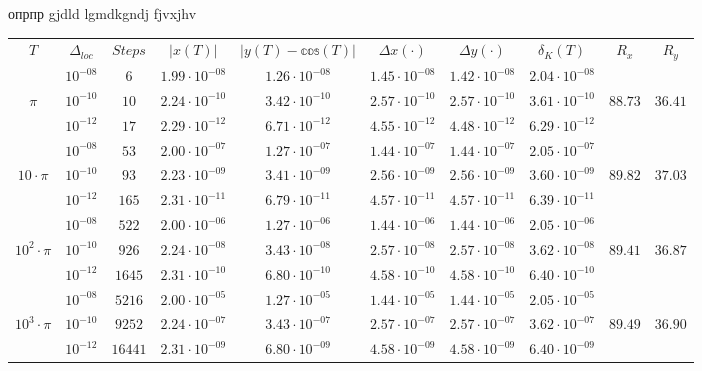 \documentclass[a4paper,10pt]{article}
\begin{document}
опрпр
\tiny 
gjdld
\small
lgmdkgndj
\Huge
fjvxjhv

\begin{tabular}{|c|c|c|c|c|c|c|c|c|c|}
\hline
$T$&$\Delta_{loc}$&$Steps$&$|x(T)|$&$|y(T)-\mathds{cos}(T)|$&$\Delta x(\cdot)$&$\Delta y(\cdot)$&$\delta_K(T)$&$R_x$&$R_y$\\
\cline{1-10}
&$ 10^{-08} $&$  6  $&$ 1.99\cdot 10^{-08} $&$ 1.26\cdot 10^{-08} $&$ 1.45\cdot 10^{-08} $&$ 1.42\cdot 10^{-08} $&$ 2.04\cdot 10^{-08} $&$ $& \\
\cline{2-8}
$\pi $&$ 10^{-10} $&$ 10 $&$ 2.24\cdot 10^{-10} $&$ 3.42\cdot 10^{-10} $&$ 2.57\cdot 10^{-10} $&$ 2.57\cdot 10^{-10} $&$ 3.61\cdot 10^{-10} $&$ 88.73 $&$ 36.41 $\\
\cline{2-8}
&$ 10^{-12} $&$ 17 $&$ 2.29\cdot 10^{-12} $&$ 6.71\cdot 10^{-12} $&$ 4.55\cdot 10^{-12} $&$ 4.48\cdot 10^{-12} $&$ 6.29\cdot 10^{-12} $&$ $& \\
\cline{1-10}
&$ 10^{-08} $&$ 53 $&$ 2.00\cdot 10^{-07} $&$ 1.27\cdot 10^{-07} $&$ 1.44\cdot 10^{-07} $&$ 1.44\cdot 10^{-07} $&$ 2.05\cdot 10^{-07} $&$ $&\\
\cline{2-8}
$10\cdot \pi $&$ 10^{-10} $&$ 93 $&$ 2.23\cdot 10^{-09} $&$ 3.41\cdot 10^{-09} $&$ 2.56\cdot 10^{-09} $&$ 2.56\cdot 10^{-09} $&$ 3.60\cdot 10^{-09} $&$89.82$&$37.03$\\
\cline{2-8}
&$ 10^{-12} $&$ 165 $&$ 2.31\cdot 10^{-11} $&$ 6.79\cdot 10^{-11} $&$ 4.57\cdot 10^{-11} $&$ 4.57\cdot 10^{-11} $&$ 6.39\cdot 10^{-11} $&$ $&\\
\cline{1-10}
&$10^{-08}$&$ 522$&$ 2.00\cdot 10^{-06}$&$  1.27\cdot 10^{-06}$&$  1.44\cdot 10^{-06}$&$  1.44\cdot 10^{-06}$&$  2.05\cdot 10^{-06}$&&\\
\cline{2-8}
$10^2 \cdot \pi$&$10^{-10}$&$ 926$&$ 2.24\cdot 10^{-08}$&$  3.43\cdot 10^{-08}$&$  2.57\cdot 10^{-08}$&$  2.57\cdot 10^{-08}$&$  3.62\cdot 10^{-08}$&$89.41$&$36.87$\\ 
\cline{2-8}
&$10^{-12}$&$ 1645$&$ 2.31\cdot 10^{-10}$&$  6.80\cdot 10^{-10}$&$  4.58\cdot 10^{-10}$&$  4.58\cdot 10^{-10}$&$  6.40\cdot 10^{-10}$&&\\
\cline{1-10}
&$10^{-08}$&$ 5216$&$  2.00\cdot 10^{-05}$&$  1.27\cdot 10^{-05}$&$  1.44\cdot 10^{-05}$&$  1.44\cdot 10^{-05}$&$  2.05\cdot 10^{-05}$& &\\
\cline{2-8}
$10^3 \cdot \pi$&$10^{-10}$&$ 9252$&$  2.24\cdot 10^{-07}$&$  3.43\cdot 10^{-07}$&$  2.57\cdot 10^{-07}$&$  2.57\cdot 10^{-07}$&$  3.62\cdot 10^{-07}$&$89.49$&$36.90$\\ 
\cline{2-8}
&$10^{-12}$&$ 16441$&$  2.31\cdot 10^{-09}$&$  6.80\cdot 10^{-09}$&$  4.58\cdot 10^{-09}$&$  4.58\cdot 10^{-09}$&$  6.40\cdot 10^{-09}$& &\\

\end{tabular}
\end{document}
